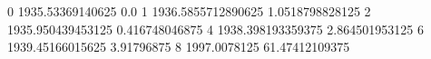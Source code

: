 0 1935.53369140625 0.0
1 1936.5855712890625 1.0518798828125
2 1935.950439453125 0.416748046875
4 1938.398193359375 2.864501953125
6 1939.45166015625 3.91796875
8 1997.0078125 61.47412109375

